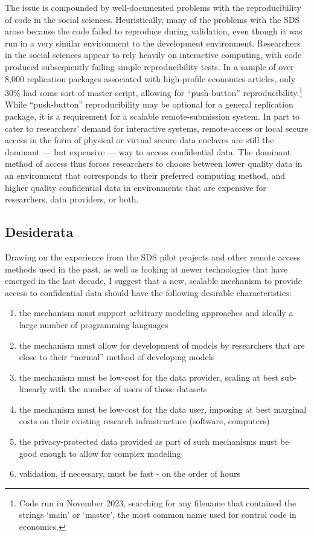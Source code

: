 \documentclass[12pt]{article}
\begin{document}
The issue is compounded by well-documented problems with the reproducibility of code in the social sciences. Heuristically, many of the problems with the SDS arose because the code failed to reproduce during validation, even though it was  run in a very similar environment to the development environment. Researchers in the social sciences appear to rely heavily on interactive computing, with code produced subsequently failing simple reproducibility tests. In a sample of over 8,000 replication packages associated with high-profile economics articles, only 30\% had some sort of master script, allowing for ``push-button'' reproducibility.\footnote{Code run in November 2023, searching for any filename that contained the strings `main' or `master', the most common name used for control code in economics.} While ``push-button'' reproducibility may be optional for a general replication package, it is a requirement for a scalable remote-submission system. In part to cater to researchers' demand for interactive systems, remote-access or local secure access in the form of physical or virtual secure data enclaves are still the dominant --- but expensive --- way to access confidential data. The dominant method of access thus forces researchers to choose between lower quality data in an environment that corresponds to their preferred computing method, and higher quality confidential data in environments that are expensive for researchers, data providers, or both.

\subsection{Desiderata}
\label{sec:desiderata}

Drawing on the experience from the SDS pilot projects and other remote access methods used in the past, as well as looking at newer technologies that have emerged in the last decade, I suggest that a new, scalable mechanism to provide access to confidential data should have the following desirable characteristics:

\begin{enumerate}
    \item the mechanism must support arbitrary modeling approaches and ideally a large number of programming languages
    \item the mechanism must allow for development of models by researchers that are close to their ``normal'' method of developing models
    \item the mechanism must be low-cost for the data provider, scaling at best sub-linearly with the number of users of those datasets
    \item the mechanism must be low-cost for the data user, imposing at best marginal costs on their existing research infrastructure (software, computers)
    \item the privacy-protected data provided as part of such mechanisms must be good enough to allow for complex modeling
    \item validation, if necessary, must be fast - on the order of hours
\end{enumerate}
\end{document}
